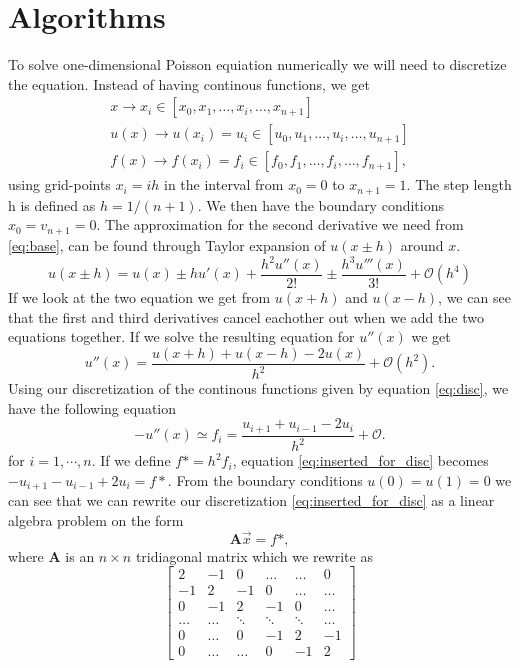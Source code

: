 \documentclass[10pt, a4paper]{amsart}
\begin{document}
\section{Algorithms} 
To solve one-dimensional Poisson equiation numerically we will need to discretize the equation. Instead of having continous functions, we get 
\begin{equation}\label{eq:disc}
	\begin{split}
		x \rightarrow x_i\in[x_0,x_1, \dots ,x_i,\dots ,x_{n+1}]\\
		u(x) \rightarrow u(x_i) = u_i \in[u_0,u_1, \dots ,u_i,\dots ,u_{n+1}]\\	
		f(x) \rightarrow f(x_i) = f_i \in[f_0,f_1, \dots ,f_i,\dots ,f_{n+1}],
	\end{split}
\end{equation}
using grid-points $x_i = ih$ in the interval from $x_0 = 0$ to $x_{n+1} = 1$. The step length h is defined as $h = 1/(n+1)$. We then have the boundary conditions $x_0 = v_{n+1} = 0$. The approximation for the second derivative we need from \ref{eq:base}, can be found through Taylor expansion of $u(x\pm h)$ around $x$.
\begin{equation}
	u(x\pm h) = u(x) \pm hu'(x) + \frac{h^2u''(x)}{2!} \pm \frac{h^3u'''(x)}{3!} + \mathcal{O}(h^4)\label{eq:taylor_exp}
\end{equation}
If we look at the two equation we get from $u(x+h)$ and $u(x-h)$, we can see that the first and third derivatives cancel eachother out when we add the two equations together. If we solve the resulting equation for $u''(x)$ we get 
\begin{equation}
u''(x) = \frac{u(x+h) + u(x-h) - 2u(x)}{h^2} + \mathcal{O}(h^2).\label{eq:second_der}
\end{equation}
Using our discretization of the continous functions given by equation \ref{eq:disc}, we have the following equation
\begin{equation}
-u''(x) \simeq f_i = \frac{u_{i+1} + u_{i-1} -2u_i}{h^2} +\mathcal{O}. \label{eq:inserted_for_disc}
\end{equation}
for $i = 1,\cdots , n$. 
If we define $f* = h^2f_i$, equation \ref{eq:inserted_for_disc} becomes $-u_{i+1} - u_{i-1} +2u_i = f*$. From the boundary conditions $u(0) = u(1) = 0$ we can see that we can rewrite our discretization \ref{eq:inserted_for_disc} as a linear algebra problem on the form
\begin{equation}
\mathbf{A}\vec{x} = f*, \nonumber
\end{equation}
where $\mathbf{A}$ is an $n\times n$ tridiagonal matrix which we rewrite as 
\begin{equation}
\begin{bmatrix}
2 & -1 & 0 & \dots & \dots & 0 \\
-1 & 2 & -1 & 0 & \dots & \dots \\
0 & -1 & 2 & -1 & 0 & \dots \\
\dots & \dots & \ddots & \ddots & \ddots & \dots\\
0 & \dots & 0 & -1 & 2 & -1 \\
0 & \dots & \dots & 0 & -1 & 2
\end{bmatrix}
\end{equation}
\end{document}
